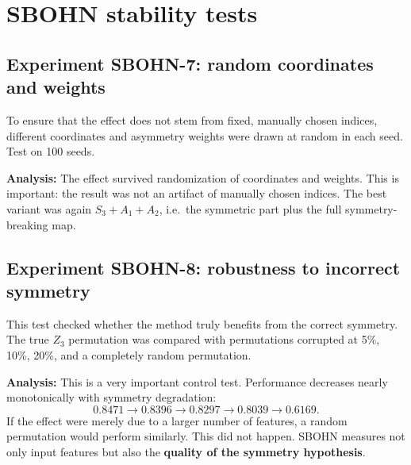 \documentclass[11pt,a4paper]{report}
\begin{document}

\section{SBOHN stability tests}

\subsection{Experiment SBOHN-7: random coordinates and weights}

To ensure that the effect does not stem from fixed, manually chosen indices,
different coordinates and asymmetry weights were drawn at random in each seed. Test on 100
seeds.

\noindent{}


\noindent{}


\textbf{Analysis:} The effect survived randomization of coordinates and weights. This is important: the result
was not an artifact of manually chosen indices. The best variant was again
$S_3+A_1+A_2$, i.e.\ the symmetric part plus the full symmetry-breaking map.

\subsection{Experiment SBOHN-8: robustness to incorrect symmetry}

This test checked whether the method truly benefits from the correct symmetry. The
true $Z_3$ permutation was compared with permutations corrupted at 5\%, 10\%, 20\%, and
a completely random permutation.

\noindent{}


\noindent{}


\textbf{Analysis:} This is a very important control test. Performance decreases nearly monotonically
with symmetry degradation:
\[
0.8471\to0.8396\to0.8297\to0.8039\to0.6169.
\]
If the effect were merely due to a larger number of features, a random permutation would perform
similarly. This did not happen. SBOHN measures not only input features but also
the \textbf{quality of the symmetry hypothesis}.
\end{document}
